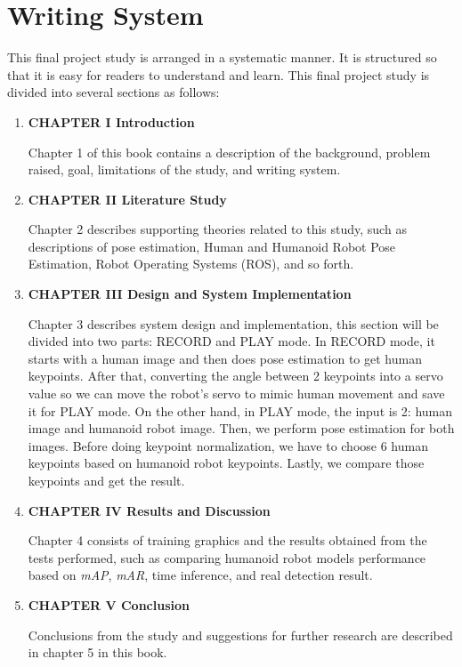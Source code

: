 \section{Writing System}
\label{sec:writingsystem}

This final project study is arranged in a systematic manner.
It is structured so that it is easy for readers to understand and learn.
This final project study is divided into several sections as follows:

\begin{enumerate}[nolistsep]

  \item \textbf{CHAPTER I Introduction}

        Chapter 1 of this book contains a description of the background, problem raised, goal, limitations of the study, and writing system.

        \vspace{2ex}

  \item \textbf{CHAPTER II Literature Study}

        Chapter 2 describes supporting theories related to this study, such as descriptions of pose estimation, Human and Humanoid Robot Pose Estimation, Robot Operating Systems (ROS), and so forth.

        \vspace{2ex}

  \item \textbf{CHAPTER III Design and System Implementation}

        Chapter 3 describes system design and implementation, this section will be divided into two parts: RECORD and PLAY mode.
        In RECORD mode, it starts with a human image and then does pose estimation to get human keypoints. After that, converting the angle between 2 keypoints into a servo value
        so we can move the robot's servo to mimic human movement and save it for PLAY mode.
        On the other hand, in PLAY mode, the input is 2: human image and humanoid robot image. Then, we perform pose estimation for both images. Before doing keypoint normalization,
        we have to choose 6 human keypoints based on humanoid robot keypoints. Lastly, we compare those keypoints and get the result.

        \vspace{2ex}

  \item \textbf{CHAPTER IV Results and Discussion}

        Chapter 4 consists of training graphics and the results obtained from the tests performed, such as comparing humanoid robot models performance based on \emph{mAP}, \emph{mAR}, time inference,
        and real detection result.

        \vspace{2ex}

  \item \textbf{CHAPTER V Conclusion}

        Conclusions from the study and suggestions for further research are described in chapter 5 in this book.

\end{enumerate}

